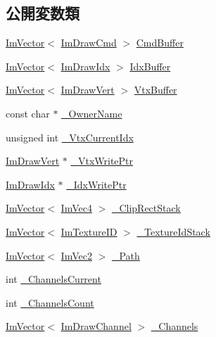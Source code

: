 \subsection*{公開変数類}
\begin{DoxyCompactItemize}
\item 
\mbox{\hyperlink{class_im_vector}{Im\+Vector}}$<$ \mbox{\hyperlink{struct_im_draw_cmd}{Im\+Draw\+Cmd}} $>$ \mbox{\hyperlink{struct_im_draw_list_a67a4b5cc4c83bc3b81d96c46cbd38a07}{Cmd\+Buffer}}
\item 
\mbox{\hyperlink{class_im_vector}{Im\+Vector}}$<$ \mbox{\hyperlink{imgui_8h_afdc8744a5ac1a968b1ddfa47e13b2fa1}{Im\+Draw\+Idx}} $>$ \mbox{\hyperlink{struct_im_draw_list_adf292ff70a954d82daf061c609e75dfc}{Idx\+Buffer}}
\item 
\mbox{\hyperlink{class_im_vector}{Im\+Vector}}$<$ \mbox{\hyperlink{struct_im_draw_vert}{Im\+Draw\+Vert}} $>$ \mbox{\hyperlink{struct_im_draw_list_aa8ff4aee39cf3c3791b7e29a7b4264be}{Vtx\+Buffer}}
\item 
const char $\ast$ \mbox{\hyperlink{struct_im_draw_list_a643f385fb9d5fc35a431e72a10a212f5}{\+\_\+\+Owner\+Name}}
\item 
unsigned int \mbox{\hyperlink{struct_im_draw_list_a2228793183665bc3d8612795555fe505}{\+\_\+\+Vtx\+Current\+Idx}}
\item 
\mbox{\hyperlink{struct_im_draw_vert}{Im\+Draw\+Vert}} $\ast$ \mbox{\hyperlink{struct_im_draw_list_a67f870f5140bf1cab14b8515b7386073}{\+\_\+\+Vtx\+Write\+Ptr}}
\item 
\mbox{\hyperlink{imgui_8h_afdc8744a5ac1a968b1ddfa47e13b2fa1}{Im\+Draw\+Idx}} $\ast$ \mbox{\hyperlink{struct_im_draw_list_a771f4c7f71873852fe030c3e498e5843}{\+\_\+\+Idx\+Write\+Ptr}}
\item 
\mbox{\hyperlink{class_im_vector}{Im\+Vector}}$<$ \mbox{\hyperlink{struct_im_vec4}{Im\+Vec4}} $>$ \mbox{\hyperlink{struct_im_draw_list_ae950024f053f3c94dc2c763d20be609d}{\+\_\+\+Clip\+Rect\+Stack}}
\item 
\mbox{\hyperlink{class_im_vector}{Im\+Vector}}$<$ \mbox{\hyperlink{imgui_8h_a364f4447ecbc4ca176145ccff9db6286}{Im\+Texture\+ID}} $>$ \mbox{\hyperlink{struct_im_draw_list_a848faddd121da050214b8d8159e5e704}{\+\_\+\+Texture\+Id\+Stack}}
\item 
\mbox{\hyperlink{class_im_vector}{Im\+Vector}}$<$ \mbox{\hyperlink{struct_im_vec2}{Im\+Vec2}} $>$ \mbox{\hyperlink{struct_im_draw_list_a5bdc39abf351360500048628b8dc1b07}{\+\_\+\+Path}}
\item 
int \mbox{\hyperlink{struct_im_draw_list_a143ff30108f3dca8c28c7925e23d358b}{\+\_\+\+Channels\+Current}}
\item 
int \mbox{\hyperlink{struct_im_draw_list_ae3854c12dbac41400f4acb65192f5015}{\+\_\+\+Channels\+Count}}
\item 
\mbox{\hyperlink{class_im_vector}{Im\+Vector}}$<$ \mbox{\hyperlink{struct_im_draw_channel}{Im\+Draw\+Channel}} $>$ \mbox{\hyperlink{struct_im_draw_list_ae6be941728e5b2c81a03c78e4aa22629}{\+\_\+\+Channels}}
\end{DoxyCompactItemize}


